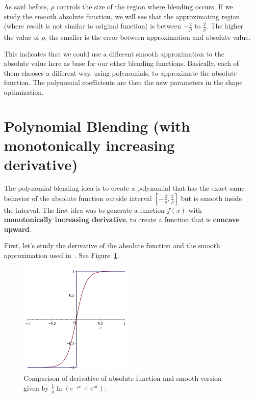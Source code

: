 \documentclass[11pt]{article}
\begin{document}
As said before, $\rho$ controls the size of the region where blending occurs. If we study the smooth absolute function, we will see that the approximating region (where result is not similar to original function) is between $-\frac2\rho$ to $\frac2\rho$. The higher the value of $\rho$, the smaller is the error between approximation and absolute value.

This indicates that we could use a different smooth approximation to the absolute value here as base for our other blending functions. Basically, each of them chooses a different way, using polynomials, to approximate the absolute function. The polynomial coefficients are then the new parameters in the shape optimization.

\section{Polynomial Blending (with monotonically increasing derivative)}
The polynomial blending idea is to create a polynomial that has the exact same behavior of the absolute function outside interval $[-\frac2\rho,\frac2\rho]$ but is smooth inside the interval. The first idea was to generate a function $f(x)$ with \textbf{monotonically increasing derivative}, to create a function that is \textbf{concave upward}.

First, let's study the derivative of the absolute function and the smooth approximation used in~\cite{Panetta2017}. See Figure~\ref{fig:derivative_absolute_function}.
  \begin{figure}[!hbt]
    \begin{center}
      \includegraphics[width=0.5\textwidth]{derivative_absolute_function}
    \end{center}
    \caption{Comparison of derivative of absolute function and smooth version given by $\frac 1\rho \ln\left(e^{-\rho \epsilon} + e^{\rho \epsilon} \right)$.}
    \label{fig:derivative_absolute_function}
  \end{figure}
\end{document}
